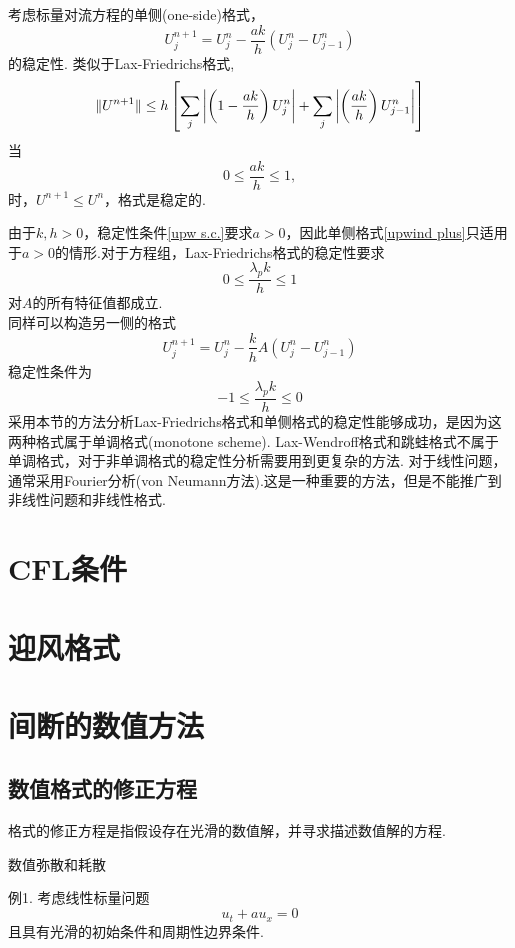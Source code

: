 \begin{myexample}
	考虑标量对流方程的单侧(one-side)格式，
	\begin{equation} \label{upwind plus}
		U_j^{n+1} = U_j^n - \frac{ak}{h}(U_j^n - U_{j-1}^n)
	\end{equation}
	的稳定性.
	类似于Lax-Friedrichs格式,
	\begin{equation}
		\lVert U^{n+1}\rVert \le h \left[ \sum_j    \left| \left( 1-\frac{ak}{h}\right)U_j^n \right|  + \sum_j \left| \left( \frac{ak}{h}\right)U_{j-1}^n \right|  \right]
	\end{equation}
	当
	\begin{equation}\label{upw s.c.}
		0 \le \frac{ak}{h} \le 1,
	\end{equation}
	时，$U^{n+1}\le U^n$，格式是稳定的.
\end{myexample}
由于$k,h >0$，稳定性条件\eqref{upw s.c.}要求$a>0$，因此单侧格式\eqref{upwind plus}只适用于$a>0$的情形.对于方程组，Lax-Friedrichs格式的稳定性要求
	\begin{equation}
    	 0 \le \frac{\lambda_p k}{h}   \le 1
	\end{equation}
对$A$的所有特征值都成立.\\
同样可以构造另一侧的格式
	\begin{equation} 
		U_j^{n+1} = U_j^n - \frac{k}{h}A(U_j^n - U_{j-1}^n)
	\end{equation}
稳定性条件为
	\begin{equation}
	-1 \le \frac{\lambda_p k}{h}   \le 0
	\end{equation}
	采用本节的方法分析Lax-Friedrichs格式和单侧格式的稳定性能够成功，是因为这两种格式属于单调格式(monotone scheme). Lax-Wendroff格式和跳蛙格式不属于单调格式，对于非单调格式的稳定性分析需要用到更复杂的方法. 对于线性问题，通常采用Fourier分析(von Neumann方法).这是一种重要的方法，但是不能推广到非线性问题和非线性格式.
	
\section{CFL条件}

\section{迎风格式}

\section{间断的数值方法}

\subsection{数值格式的修正方程}
	格式的修正方程是指假设存在光滑的数值解，并寻求描述数值解的方程.

数值弥散和耗散

例1. 考虑线性标量问题 \nocite{Leveque92}
	\begin{equation*}
		u_t + a u_x = 0
	\end{equation*}
	且具有光滑的初始条件和周期性边界条件.